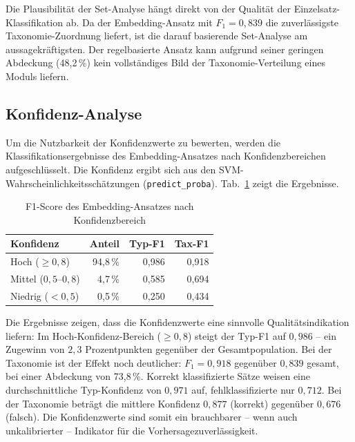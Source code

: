 Die Plausibilität der Set-Analyse hängt direkt von der Qualität der Einzelsatz-Klassifikation ab.
Da der Embedding-Ansatz mit $F_1 = 0{,}839$ die zuverlässigste Taxonomie-Zuordnung liefert, ist die darauf basierende Set-Analyse am aussagekräftigsten.
Der regelbasierte Ansatz kann aufgrund seiner geringen Abdeckung (48{,}2\,\%) kein vollständiges Bild der Taxonomie-Verteilung eines Moduls liefern.

\subsection{Konfidenz-Analyse}\label{sec:eval-konfidenz}

Um die Nutzbarkeit der Konfidenzwerte zu bewerten, werden die Klassifikationsergebnisse des Embedding-Ansatzes nach Konfidenzbereichen aufgeschlüsselt.
Die Konfidenz ergibt sich aus den SVM-Wahrscheinlichkeitsschätzungen (\texttt{predict\_proba}).
Tab.~\ref{tab:eval-konfidenz} zeigt die Ergebnisse.

\begin{table}[H]
\caption{F1-Score des Embedding-Ansatzes nach Konfidenzbereich\label{tab:eval-konfidenz}}
\centering
\begin{tabular}{lrrr}
\hline
\textbf{Konfidenz} & \textbf{Anteil} & \textbf{Typ-F1} & \textbf{Tax-F1} \\
\hline
Hoch ($\geq 0{,}8$) & 94{,}8\,\% & 0{,}986 & 0{,}918 \\
Mittel ($0{,}5$--$0{,}8$) & 4{,}7\,\% & 0{,}585 & 0{,}694 \\
Niedrig ($< 0{,}5$) & 0{,}5\,\% & 0{,}250 & 0{,}434 \\
\hline
\end{tabular}
\end{table}

Die Ergebnisse zeigen, dass die Konfidenzwerte eine sinnvolle Qualitätsindikation liefern: Im Hoch-Konfidenz-Bereich ($\geq 0{,}8$) steigt der Typ-F1 auf $0{,}986$ -- ein Zugewinn von $2{,}3$ Prozentpunkten gegenüber der Gesamtpopulation.
Bei der Taxonomie ist der Effekt noch deutlicher: $F_1 = 0{,}918$ gegenüber $0{,}839$ gesamt, bei einer Abdeckung von 73{,}8\,\%.
Korrekt klassifizierte Sätze weisen eine durchschnittliche Typ-Konfidenz von $0{,}971$ auf, fehlklassifizierte nur $0{,}712$.
Bei der Taxonomie beträgt die mittlere Konfidenz $0{,}877$ (korrekt) gegenüber $0{,}676$ (falsch).
Die Konfidenzwerte sind somit ein brauchbarer -- wenn auch unkalibrierter -- Indikator für die Vorhersagezuverlässigkeit.


